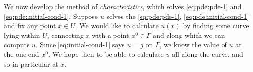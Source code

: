We now develop the method of \emph{characteristics}, which solves
\eqref{eq:pde:pde-1} and \eqref{eq:pde:initial-cond-1}. Suppose \(u\)
solves the \eqref{eq:pde:pde-1}, \eqref{eq:pde:initial-cond-1} and fix any
point \(x\in U\). We would like to calculate \(u(x)\) by finding some curve
lying within \(U\), connecting \(x\) with a point \(x^0\in\Gamma\) and
along which we can compute \(u\). Since \eqref{eq:initial-cond-1} says
\(u=g\) on \(\Gamma\), we know the value of \(u\) at the one end
\(x^0\). We hope then to be able to calculate \(u\) all along the curve,
and so in particular at \(x\).



